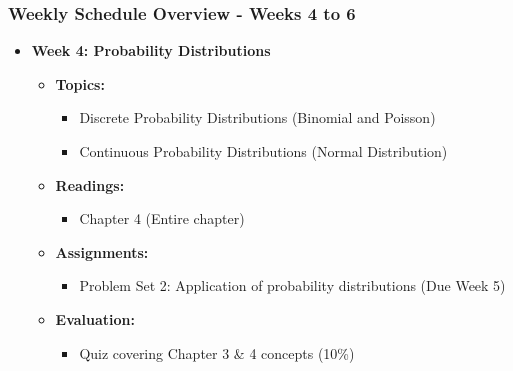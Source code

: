 \documentclass[aspectratio=169]{beamer}
\begin{document}
\begin{frame}[fragile]
    \frametitle{Weekly Schedule Overview - Weeks 4 to 6}
    \begin{itemize}
        \item \textbf{Week 4: Probability Distributions}
        \begin{itemize}
            \item \textbf{Topics:}
                \begin{itemize}
                    \item Discrete Probability Distributions (Binomial and Poisson)
                    \item Continuous Probability Distributions (Normal Distribution)
                \end{itemize}
            \item \textbf{Readings:}
                \begin{itemize}
                    \item Chapter 4 (Entire chapter)
                \end{itemize}
            \item \textbf{Assignments:}
                \begin{itemize}
                    \item Problem Set 2: Application of probability distributions (Due Week 5)
                \end{itemize}
            \item \textbf{Evaluation:}
                \begin{itemize}
                    \item Quiz covering Chapter 3 \& 4 concepts (10\%)
                \end{itemize}
        \end{itemize}
        

\end{itemize}
\end{frame}
\end{document}
